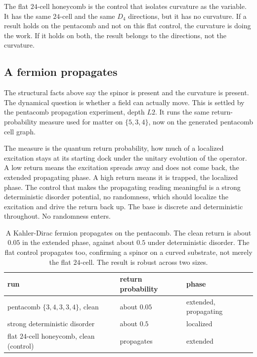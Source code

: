 The flat $24$-cell honeycomb is the control that isolates curvature as the variable.
It has the same $24$-cell and the same $D_4$ directions, but it has no curvature. If
a result holds on the pentacomb and not on this flat control, the curvature is doing
the work. If it holds on both, the result belongs to the directions, not the
curvature.

\subsection{A fermion propagates}

The structural facts above say the spinor is present and the curvature is present.
The dynamical question is whether a field can actually move. This is settled by the
pentacomb propagation experiment, depth $L2$. It runs the same return-probability
measure used for matter on $\{5,3,4\}$, now on the generated pentacomb cell graph.

The measure is the quantum return probability, how much of a localized excitation
stays at its starting dock under the unitary evolution of the operator. A low return
means the excitation spreads away and does not come back, the extended propagating
phase. A high return means it is trapped, the localized phase. The control that
makes the propagating reading meaningful is a strong deterministic disorder
potential, no randomness, which should localize the excitation and drive the return
back up. The base is discrete and deterministic throughout. No randomness enters.

\begin{table}[ht]
\centering
\begin{tabular}{@{}lll@{}}
\toprule
run & return probability & phase \\
\midrule
pentacomb $\{3,4,3,3,4\}$, clean & about $0.05$ & extended, propagating \\
strong deterministic disorder & about $0.5$ & localized \\
flat $24$-cell honeycomb, clean (control) & propagates & extended \\
\bottomrule
\end{tabular}
\caption{A Kahler-Dirac fermion propagates on the pentacomb. The clean return is
about $0.05$ in the extended phase, against about $0.5$ under deterministic disorder.
The flat control propagates too, confirming a spinor on a curved substrate, not
merely the flat $24$-cell. The result is robust across two sizes.}
\label{tab:pentacomb-propagation}
\end{table}

